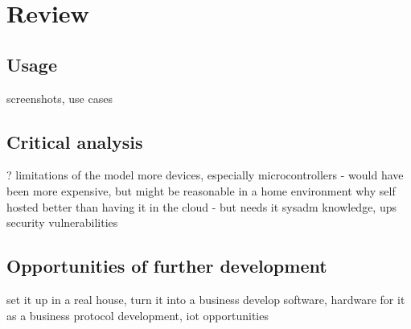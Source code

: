 \chapter{Review} %
\section{Usage}
screenshots, use cases
\section{Critical analysis}
?
limitations of the model
more devices, especially microcontrollers - would have been more expensive, but might be reasonable in a home environment
why self hosted better than having it in the cloud - but needs it sysadm knowledge, ups
security vulnerabilities
\section{Opportunities of further development}
set it up in a real house, turn it into a business
develop software, hardware for it as a business
protocol development, iot opportunities
